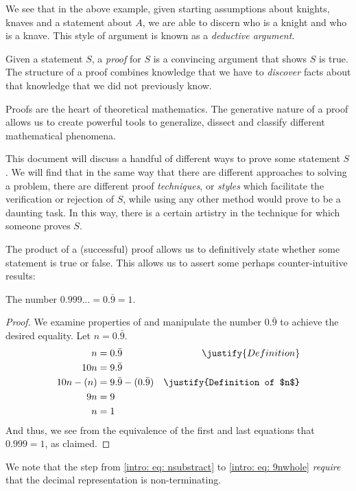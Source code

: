 We see that in the above example, given starting assumptions about knights, knaves and
a statement about $A$, we are able to discern who is a knight and who is a knave.
This style of argument is known as a \emph{deductive argument}.


Given a statement $S$, a \emph{proof} for $S$ is a convincing argument that shows $S$ is true.
The structure of a proof combines knowledge that we have to \emph{discover} facts about that knowledge
that we did not previously know.

Proofs are the heart of theoretical mathematics. The generative nature of a proof
allows us to create powerful tools to generalize, dissect and classify different
mathematical phenomena.

This document will discuss a handful of different ways to prove some statement $S$.
We will find that in the same way that there are different approaches to solving a
problem, there are different proof \emph{techniques}, or \emph{styles} which
facilitate the verification or rejection of $S$, while using any other method would
prove to be a daunting task. In this way, there is a certain artistry in the
technique for which someone proves $S$.

The product of a (successful) proof allows us to definitively state whether some
statement is true or false. This allows us to assert some perhaps counter-intuitive results:
\begin{claim}
  The number $0.999... = 0.\bar{9} = 1$.
  \begin{proof}
    We examine properties of and manipulate the number $0.\bar{9}$ to achieve the desired
    equality. Let $n = 0.\bar{9}$.
    \begin{align}
       n  &= 0.\bar{9} & \justify{Definition}                             \\
       10n &= 9.\bar{9}   											                          \\
       10n - (n) &= 9.\bar{9} - (0.\bar{9}) & \justify{Definition of $n$} \label{intro: eq: nsubstract} \\
       9n &= 9                                                            \label{intro: eq: 9nwhole}\\
        n &= 1
    \end{align}
    And thus, we see from the equivalence of the first and last equations that $0.999 = 1$, as claimed.
  \end{proof}
\end{claim}
We note that the step from \ref{intro: eq: nsubstract} to \ref{intro: eq: 9nwhole} \emph{require} that the decimal representation is non-terminating.


